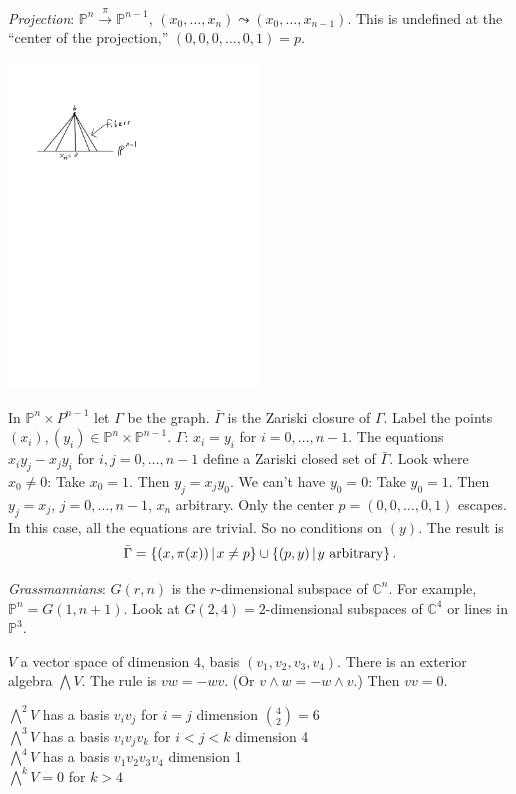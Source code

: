 \documentclass [letterpaper,11pt,twoside]{article}
\begin{document}
  \emph{Projection}: $\mathbb P^n \stackrel{\pi}{\to} \mathbb P^{n-1}$, $(x_0, \ldots, x_n)\leadsto (x_0, \ldots, x_{n-1})$.  This is undefined at the ``center of the projection,'' $(0, 0, 0, \ldots, 0, 1) = p$.
  \begin{center}\includegraphics[width=0.5\textwidth]{2011-04-01_Diagram_001}\end{center}
  In $\mathbb P^n \times P^{n-1}$ let $\Gamma$ be the graph.  $\bar \Gamma$ is the Zariski closure of $\Gamma$.  Label the points $(x_i), (y_i) \in \mathbb P^n \times \mathbb P^{n-1}$.  $\Gamma$: $x_i = y_i$ for $i = 0, \ldots, n-1$.  The equations $x_i y_j - x_j y_i$ for $i, j = 0, \ldots, n-1$ define a Zariski closed set of $\bar \Gamma$.  Look where $x_0 \ne 0$: Take $x_0 = 1$.  Then $y_j = x_j y_0$.  We can't have $y_0 = 0$: Take $y_0 = 1$.  Then $y_j = x_j$, $j = 0, \ldots, n-1$, $x_n$ arbitrary.  Only the center $p = (0, 0, \ldots, 0, 1)$ escapes.  In this case, all the equations are trivial.  So no conditions on $(y)$.  The result is
  $$\bar \Gamma = \mathset[(x, \pi(x))]{x\ne p} \cup \mathset[(p, y)]{y\text{ arbitrary}}.$$

  \emph{Grassmannians}: $G(r, n)$ is the $r$-dimensional subspace of $\mathbb C^n$.  For example, $\mathbb P^n = G(1, n+1)$.  Look at $G(2, 4) = 2$-dimensional subspaces of $\mathbb C^4$ or lines in $\mathbb P^3$.

  $V$ a vector space of dimension 4, basis $(v_1, v_2, v_3, v_4)$.  There is an exterior algebra $\bigwedge V$.  The rule is $vw = -wv$.  (Or $v\wedge w = -w\wedge v$.)  Then $vv = 0$.

  \noindent $\bigwedge^2 V$ has a basis $v_iv_j$ for $i = j$ dimension $\binom42 = 6$\\
  \noindent $\bigwedge^3 V$ has a basis $v_iv_jv_k$ for $i < j < k$ dimension 4 \\
  \noindent $\bigwedge^4 V$ has a basis $v_1v_2v_3v_4$  dimension 1 \\
  \noindent $\bigwedge^k V = 0$ for $k > 4$
\end{document}
